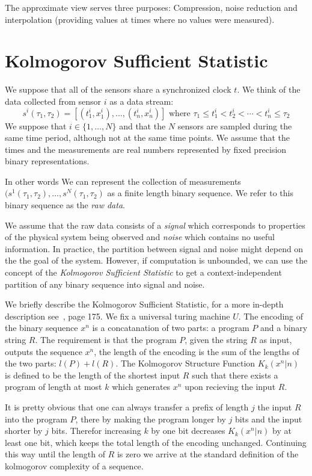 \documentclass[11pt]{article}
\begin{document}
The approximate view serves three purposes: Compression, noise
reduction and interpolation (providing values at times where no values
were measured).

\section{Kolmogorov Sufficient Statistic}

We suppose that all of the sensors share a synchronized clock $t$.
We think of the data collected from sensor $i$ as a data stream:
\[
s^i(\tau_1,\tau_2)=[(t^i_1,x^i_1),\ldots,(t^i_n,x^i_n)]
\mbox{ where } \tau_1\leq t^i_1 < t^i_2<\cdots < t^i_n \leq \tau_2
\]
We suppose that $i \in \{1,\ldots,N\}$ and that the $N$ sensors are
sampled during the same time period, although not at the same time
points. We assume that the times and the measurements are real numbers
represented by fixed precision binary representations.

In other words We can represent the collection of measurements
$(s^1(\tau_1,\tau_2),\ldots,s^N(\tau_1,\tau_2)$ as a finite length
binary sequence. We refer to this binary sequence as the {\em raw
  data}.

We assume that the raw data consists of a {\em signal} which
corresponds to properties of the physical system being observed and
{\em noise} which contains no useful information. In practice, the
partition between signal and noise might depend on the the goal of the
system. However, if computation is unbounded, we can use the concept
of the {\em Kolmogorov Sufficient Statistic} to get a
context-independent partition of any binary sequence into signal and
noise.

We briefly describe the Kolmogorov Sufficient Statistic, for a more
in-depth description see~\cite{CoverThomas}, page 175. We fix a
universal turing machine $U$. The encoding of the binary sequence
$x^n$ is a concatanation of two parts: a program $P$ and a binary
string $R$. The requirement is that the program $P$, given the string
$R$ as input, outputs the sequence $x^n$, the length of the encoding
is the sum of the lengths of the two parts: $l(P)+l(R)$.  The
Kolmogorov Structure Function $K_k(x^n|n)$ is defined to be the length
of the shortest input $R$ such that there exists a program of length
at most $k$ which generates $x^n$ upon recieving the input $R$.

It is pretty obvious that one can always transfer a prefix of length
$j$ the input $R$ into the program $P$, there by making the program
longer by $j$ bits and the input shorter by $j$ bits. Therefor
increasing $k$ by one bit decreases  $K_k(x^n|n)$ by at least one bit,
which keeps the total length of the encoding unchanged. Continuing
this way until the length of $R$ is zero we arrive at the standard
definition of the kolmogorov complexity of a sequence.
\end{document}
